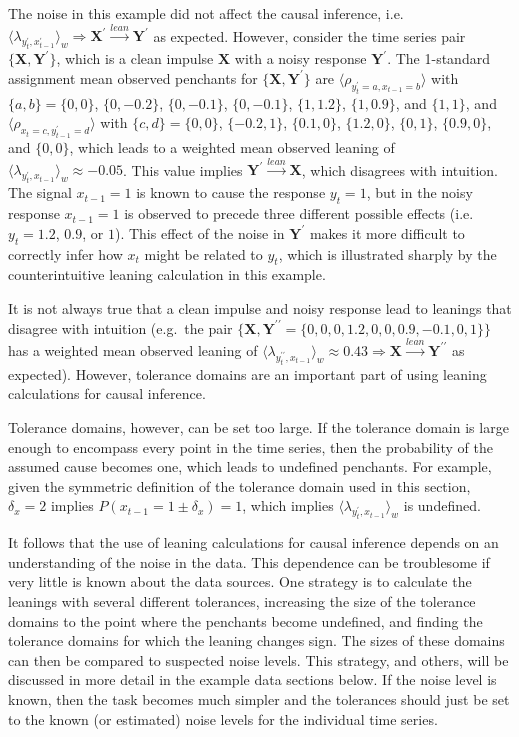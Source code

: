 \documentclass[twocolumn,aps,pre,groupedaddress]{revtex4-1}
\begin{document}
The noise in this example did not affect the causal inference, i.e.\ $\langle \lambda_{y_t^\prime,x_{t-1}^\prime} \rangle_w \Rightarrow \mathbf{X}^\prime\xrightarrow{lean}\mathbf{Y}^\prime$ as expected.  However, consider the time series pair $\{\mathbf{X},\mathbf{Y}^\prime\}$, which is a clean impulse $\mathbf{X}$ with a noisy response $\mathbf{Y}^\prime$. The 1-standard assignment mean observed penchants for $\{\mathbf{X},\mathbf{Y}^\prime\}$ are $\langle \rho_{y_t^\prime=a,x_{t-1}=b} \rangle$ with $\{a,b\} = \{0,0\}$, $\{0,-0.2\}$, $\{0,-0.1\}$, $\{0,-0.1\}$, $\{1,1.2\}$, $\{1,0.9\}$, and $\{1,1\}$, and $\langle \rho_{x_t=c,y_{t-1}^\prime=d} \rangle$ with $\{c,d\} = \{0,0\}$, $\{-0.2,1\}$, $\{0.1,0\}$, $\{1.2,0\}$, $\{0,1\}$, $\{0.9,0\}$, and $\{0,0\}$, which leads to a weighted mean observed leaning of $\langle \lambda_{y_t^\prime,x_{t-1}} \rangle_w \approx -0.05$.  This value implies $\mathbf{Y}^\prime\xrightarrow{lean}\mathbf{X}$, which disagrees with intuition.  The signal $x_{t-1} = 1$ is known to cause the response $y_t=1$, but in the noisy response $x_{t-1}=1$ is observed to precede three different possible effects (i.e.\ $y_t = 1.2$, $0.9$, or $1$).  This effect of the noise in $\mathbf{Y}^\prime$ makes it more difficult to correctly infer how $x_t$ might be related to $y_t$, which is illustrated sharply by the counterintuitive leaning calculation in this example.  

It is not always true that a clean impulse and noisy response lead to leanings that disagree with intuition (e.g.\ the pair $\{\mathbf{X},\mathbf{Y}^{\prime\prime} = \{0,0,0,1.2,0,0,0.9,-0.1,0,1\}\}$ has a weighted mean observed leaning of $\langle \lambda_{y_t^{\prime\prime},x_{t-1}} \rangle_w \approx 0.43 \Rightarrow \mathbf{X}\xrightarrow{lean}\mathbf{Y}^{\prime\prime}$ as expected).  However, tolerance domains are an important part of using leaning calculations for causal inference.  

Tolerance domains, however, can be set too large.  If the tolerance domain is large enough to encompass every point in the time series, then the probability of the assumed cause becomes one, which leads to undefined penchants.  For example, given the symmetric definition of the tolerance domain used in this section, $\delta_x = 2$ implies $P(x_{t-1} = 1\pm\delta_x) = 1$, which implies $\langle \lambda_{y_t^\prime,x_{t-1}} \rangle_w$ is undefined.

It follows that the use of leaning calculations for causal inference depends on an understanding of the noise in the data.  This dependence can be troublesome if very little is known about the data sources.  One strategy is to calculate the leanings with several different tolerances, increasing the size of the tolerance domains to the point where the penchants become undefined, and finding the tolerance domains for which the leaning changes sign.  The sizes of these domains can then be compared to suspected noise levels.  This strategy, and others, will be discussed in more detail in the example data sections below.  If the noise level is known, then the task becomes much simpler and the tolerances should just be set to the known (or estimated) noise levels for the individual time series.
\end{document}
